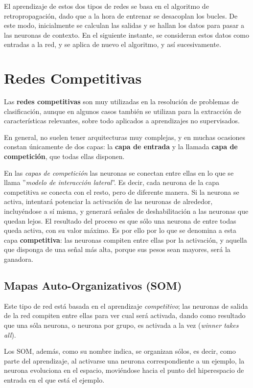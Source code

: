 \documentclass[10pt,a4paper]{article}
\begin{document}
El aprendizaje de estos dos tipos de redes se basa en el algoritmo de retropropagación, dado que a la hora de entrenar se desacoplan los bucles. De este modo, inicialmente se calculan las salidas y se hallan los datos para pasar a las neuronas de contexto. En el siguiente instante, se consideran estos datos como entradas a la red, y se aplica de nuevo el algoritmo, y así sucesivamente.

\section{Redes Competitivas}

Las \textbf{redes competitivas} son muy utilizadas en la resolución de problemas de clasificación, aunque en algunos casos también se utilizan para la extracción de características relevantes, sobre todo aplicados a aprendizajes no supervisados.

En general, no suelen tener arquitecturas muy complejas, y en muchas ocasiones constan únicamente de dos capas: la \textbf{capa de entrada} y la llamada \textbf{capa de competición}, que todas ellas disponen.

En las \textit{capas de competición} las neuronas se conectan entre ellas en lo que se llama ''\textit{modelo de interacción lateral}''. Es decir, cada neurona de la capa competitiva se conecta con el resto, pero de diferente manera. Si la neurona se activa, intentará potenciar la activación de las neuronas de alrededor, incluyéndose a sí misma, y generará señales de deshabilitación a las neuronas que quedan lejos. El resultado del proceso es que sólo una neurona de entre todas queda activa, con su valor máximo. Es por ello por lo que se denomina a esta capa \textbf{competitiva}: las neuronas compiten entre ellas por la activación, y aquella que disponga de una señal más alta, porque sus pesos sean mayores, será la ganadora.

\subsection{Mapas Auto-Organizativos (SOM)}

Este tipo de red está basada en el aprendizaje \textit{competitivo}; las neuronas de salida de la red compiten entre ellas para ver cual será activada, dando como resultado que una sóla neurona, o neurona por grupo, es activada a la vez (\textit{winner takes all}).

Los SOM, además, como su nombre indica, se organizan sólos, es decir, como parte del aprendizaje, al activarse una neurona correspondiente a un ejemplo, la neurona evoluciona en el espacio, moviéndose hacia el punto del hiperespacio de entrada en el que está el ejemplo.
\end{document}
